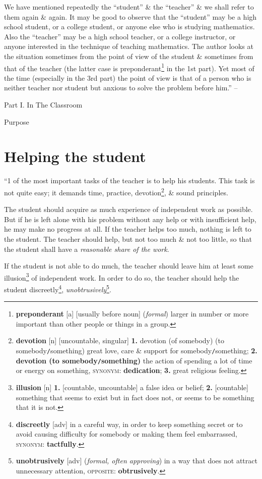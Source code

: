 \documentclass[oneside]{book}
\numberwithin{equation}{section}
\begin{document}
We have mentioned repeatedly the ``student'' \& the ``teacher'' \& we shall refer to them again \& again. It may be good to observe that the ``student'' may be a high school student, or a college student, or anyone else who is studying mathematics. Also the ``teacher'' may be a high school teacher, or a college instructor, or anyone interested in the technique of teaching mathematics. The author looks at the situation sometimes from the point of view of the student \& sometimes from that of the teacher (the latter case is preponderant\footnote{\textbf{preponderant} [a] [usually before noun] (\textit{formal}) larger in number or more important than other people or things in a group.} in the 1st part). Yet most of the time (especially in the 3rd part) the point of view is that of a person who is neither teacher nor student but anxious to solve the problem before him.'' -- \cite[Introduction, pp. xxv--xxvii]{Polya2014}

\begin{center}
	\huge Part I. In The Classroom
\end{center}

\begin{center}
	\LARGE Purpose
\end{center}

\section{Helping the student}
``1 of the most important tasks of the teacher is to help his students. This task is not quite easy; it demands time, practice, devotion\footnote{\textbf{devotion} [n] [uncountable, singular] \textbf{1.} devotion (of somebody) (to somebody\texttt{/}something) great love, care \& support for somebody\texttt{/}something; \textbf{2.} \textbf{devotion (to somebody\texttt{/}something)} the action of spending a lot of time or energy on something, \textsc{synonym}: \textbf{dedication}; \textbf{3.} great religious feeling.}, \& sound principles.

The student should acquire as much experience of independent work as possible. But if he is left alone with his problem without any help or with insufficient help, he may make no progress at all. If the teacher helps too much, nothing is left to the student. The teacher should help, but not too much \& not too little, so that the student shall have a \textit{reasonable share of the work}.

If the student is not able to do much, the teacher should leave him at least some illusion\footnote{\textbf{illusion} [n] \textbf{1.} [countable, uncountable] a false idea or belief; \textbf{2.} [countable] something that seems to exist but in fact does not, or seems to be something that it is not.} of independent work. In order to do so, the teacher should help the student discreetly\footnote{\textbf{discreetly} [adv] in a careful way, in order to keep something secret or to avoid causing difficulty for somebody or making them feel embarrassed, \textsc{synonym}: \textbf{tactfully}.}, \textit{unobtrusively}\footnote{\textbf{unobtrusively} [adv] (\textit{formal, often approving}) in a way that does not attract unnecessary attention, \textsc{opposite}: \textbf{obtrusively}.}.
\end{document}
